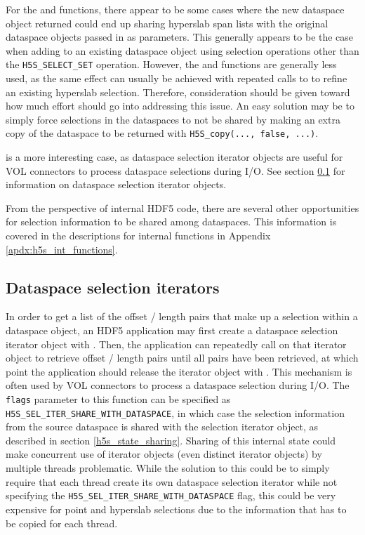 \documentclass[../HDF5_RFC.tex]{subfiles}
\begin{document}
For the  and 
functions, there appear to be some cases where the new dataspace object returned could end up
sharing hyperslab span lists with the original dataspace objects passed in as parameters. This
generally appears to be the case when adding to an existing dataspace object using selection
operations other  than the \texttt{H5S\_SELECT\_SET} operation. However, the
 and 
functions are generally less used, as the same effect can usually be achieved with repeated
calls to  to refine an existing hyperslab selection.
Therefore, consideration should be given toward how much effort should go into addressing this
issue. An easy solution may be to simply force selections in the dataspaces to not be shared
by making an extra copy of the dataspace to be returned with \texttt{H5S\_copy(..., false, ...)}.

 is a more interesting case, as dataspace selection
iterator objects are useful for VOL connectors to process dataspace selections during I/O. See
section \ref{h5s_sel_iter} for information on dataspace selection iterator objects.

From the perspective of internal HDF5 code, there are several other opportunities for
selection information to be shared among dataspaces. This information is covered in the
descriptions for internal functions in Appendix \ref{apdx:h5s_int_functions}.

\subsection{Dataspace selection iterators}
\label{h5s_sel_iter}

In order to get a list of the offset / length pairs that make up a selection within a
dataspace object, an HDF5 application may first create a dataspace selection iterator object
with . Then, the application can repeatedly call
 on that iterator object to retrieve offset /
length pairs until all pairs have been retrieved, at which point the application should
release the iterator object with . This mechanism
is often used by VOL connectors to process a dataspace selection during I/O. The \texttt{flags}
parameter to this function can be specified as \texttt{H5S\_SEL\_ITER\_SHARE\_WITH\_DATASPACE},
in which case the selection information from the source dataspace is shared with the selection
iterator object, as described in section \ref{h5s_state_sharing}. Sharing of this internal
state could make concurrent use of iterator objects (even distinct iterator objects) by 
multiple threads problematic. While the solution to this could be to simply require that
each thread create its own dataspace selection iterator while not specifying the
\texttt{H5S\_SEL\_ITER\_SHARE\_WITH\_DATASPACE} flag, this could be very expensive for
point and hyperslab selections due to the information that has to be copied for each
thread.
\end{document}
